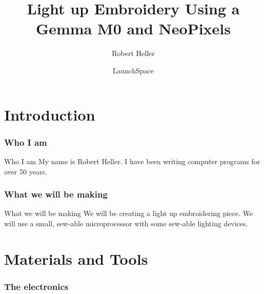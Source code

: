 \documentclass[aspectratio=169]{beamer}
\title{Light up Embroidery Using a Gemma M0 and NeoPixels}
\author{Robert Heller}
\date{LaunchSpace}
\begin{document}
\frame{\titlepage}

\part{Introduction}

\section{Who I am}
\begin{frame}[fragile]{Who I am}
My name is Robert Heller.  I have been writing computer programs for over 50
years.
\end{frame}
\section{What we will be making}
\begin{frame}[fragile]{What we will be making}
We will be creating a light up embroidering piece.  We will use a small, 
sew-able microprocessor with some sew-able lighting devices.
\end{frame}
\part{Materials and Tools}

\section{The electronics}
\frame{\tableofcontents[hideothersubsections,sectionstyle=show/hide]}
\end{document}
